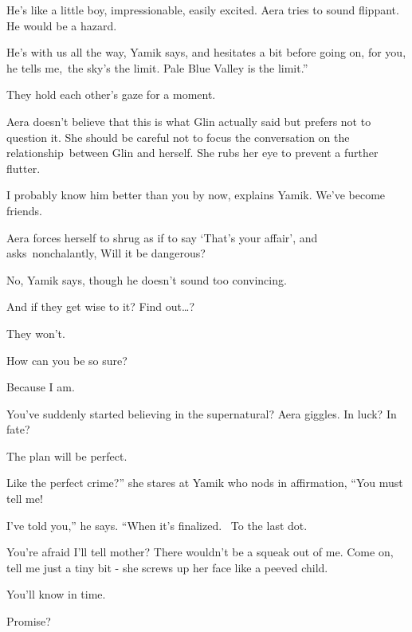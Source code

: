 \documentclass[letterpaper]{article}
\begin{document}
{\textquotedbl}He's like a little boy, impressionable, easily excited.{\textquotedbl} Aera tries to sound flippant.
{\textquotedbl}He would be a hazard.{\textquotedbl}

{\textquotedbl}He's with us all the way,{\textquotedbl} Yamik says, and hesitates a bit before going on,{
}{\textquotedbl}for you, he tells me,~the sky's the limit. Pale Blue Valley is the limit.''

They hold each other's gaze for a moment.

Aera doesn't believe that this is what Glin actually said but prefers not to question it. She should be careful not to
focus the conversation on the relationship~between Glin and herself. She rubs her eye to prevent a further flutter.

{\textquotedbl}I probably know him better than you by now,{\textquotedbl} explains Yamik. {\textquotedbl}We've become
friends.{\textquotedbl} 

Aera forces herself to shrug as if to say `That's your affair', and asks~nonchalantly, {\textquotedbl}Will it be
dangerous?{\textquotedbl} 

{\textquotedbl}No,{\textquotedbl} Yamik says, though he doesn't sound too convincing. 

{\textquotedbl}And if they get wise{ }to it? Find out{\dots}?{\textquotedbl} 

{\textquotedbl}They won't.{\textquotedbl} \ 

{\textquotedbl}How can you be so sure?{\textquotedbl} 

{\textquotedbl}Because I am.{\textquotedbl} 

{\textquotedbl}You've suddenly started believing in the supernatural?{\textquotedbl} Aera giggles. {\textquotedbl}In
luck? In fate?{\textquotedbl} 

{\textquotedbl}The plan will be perfect.{\textquotedbl} 

{\textquotedbl}Like the perfect crime?'' she stares at Yamik who nods in affirmation, ``You must tell me!{\textquotedbl}


{\textquotedbl}I've told you,'' he says. ``When it's finalized.~ To the last dot.{\textquotedbl} 

{\textquotedbl}You're afraid I'll tell mother? There wouldn't be a squeak out of me. Come on, tell me just a tiny bit
-{\textquotedbl} she screws up her face like a peeved child. 

{\textquotedbl}You'll know in time.{\textquotedbl} 

{\textquotedbl}Promise?{\textquotedbl} 
\end{document}

